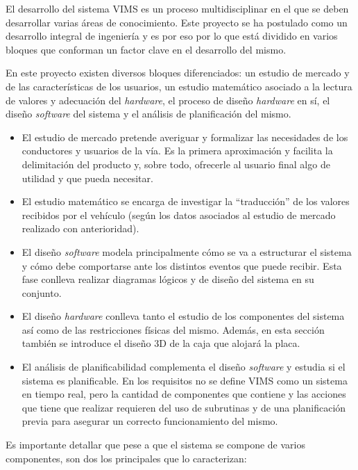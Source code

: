 El desarrollo del sistema \ac{VIMS} es un proceso multidisciplinar en el que se deben
desarrollar varias áreas de conocimiento. Este proyecto se ha postulado como
un desarrollo integral de ingeniería y es por eso por lo que está dividido en
varios bloques que conforman un factor clave en el desarrollo del mismo.

En este proyecto existen diversos bloques diferenciados: un estudio de mercado y de
las características de los usuarios, un estudio matemático asociado a la lectura de
valores y adecuación del \textit{hardware}, el proceso de diseño \textit{hardware}
en sí, el diseño \textit{software} del sistema y el análisis de planificación del mismo.

\begin{itemize}
  \item El estudio de mercado pretende averiguar y formalizar las necesidades de los
  conductores y usuarios de la vía. Es la primera aproximación y facilita la
  delimitación del producto y, sobre todo, ofrecerle al usuario final algo de utilidad
  y que pueda necesitar.
  \item El estudio matemático se encarga de investigar la ``traducción'' de los
  valores recibidos por el vehículo (según los datos asociados al estudio de mercado
  realizado con anterioridad).
  \item El diseño \textit{software} modela principalmente cómo se va a estructurar
  el sistema y cómo debe comportarse ante los distintos eventos que puede recibir.
  Esta fase conlleva realizar diagramas lógicos y de diseño del sistema en su conjunto.
  \item El diseño \textit{hardware} conlleva tanto el estudio de los componentes del
  sistema así como de las restricciones físicas del mismo. Además, en esta sección
  también se introduce el diseño 3D de la caja que alojará la placa.
  \item El análisis de planificabilidad complementa el diseño \textit{software}
  y estudia si el sistema es planificable. En los requisitos no se define \ac{VIMS}
  como un sistema en tiempo real, pero la cantidad de componentes que contiene y las
  acciones que tiene que realizar requieren del uso de subrutinas y de una planificación
  previa para asegurar un correcto funcionamiento del mismo.
\end{itemize}

Es importante detallar que pese a que el sistema se compone de varios componentes,
son dos los principales que lo caracterizan:

